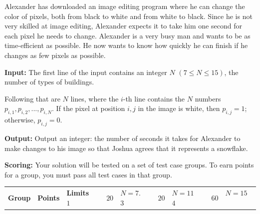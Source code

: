 Alexander has downloaded an image editing program where he can change the color of pixels, 
both from black to white and from white to black. 
Since he is not very skilled at image editing, Alexander expects it to take him one second for each pixel he needs to change. 
Alexander is a very busy man and wants to be as time-efficient as possible. 
He now wants to know how quickly he can finish if he changes as few pixels as possible.

\textbf{Input:}
The first line of the input contains an integer $N$ $(7 \le N \le 15)$, the number of types of buildings.

Following that are $N$ lines, where the $i$-th line contains the $N$ numbers $p_{i,1}, p_{i,2}, ..., p_{i,N}$. If the pixel at position $i, j$ in the image is white, then $p_{i,j} = 1$; otherwise, $p_{i,j} = 0$.

\textbf{Output:}
Output an integer: the number of seconds it takes for Alexander to make changes to his image so that Joshua agrees that it represents a snowflake.

\textbf{Scoring:}
Your solution will be tested on a set of test case groups. To earn points for a group, you must pass all test cases in that group.

\begin{tabular}{| l | l | p{12cm} |}
\hline
\textbf{Group} & \textbf{Points} & \textbf{Limits} \ \hline
$1$ & $20$ & $N=7$. \ \hline
$3$ & $20$ & $N=11$ \ \hline
$4$ & $60$ & $N=15$ \ \hline
\end{tabular}